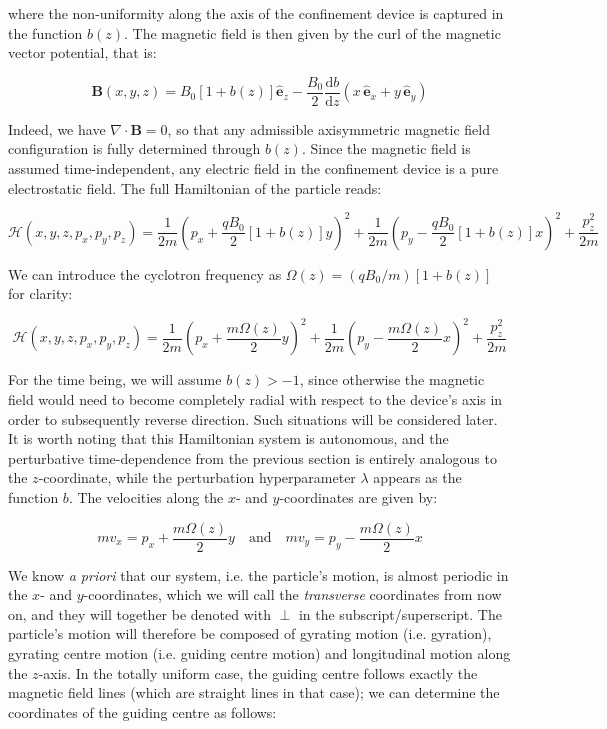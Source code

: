 where the non-uniformity along the axis of the confinement device is captured in the function $b(z)$. The magnetic field is then given by the curl of the magnetic vector potential, that is:

\begin{equation}
    \mathbf{B}(x,y,z)=B_0 \left[1+b(z)\right]\mathbf{\hat{e}}_z-\frac{B_0}{2}\frac{\mathrm{d}b}{\mathrm{d}z}\left(x\,\mathbf{\hat{e}}_x+y\,\mathbf{\hat{e}}_y\right)
\end{equation}

Indeed, we have $\nabla\cdot{\mathbf{B}}=0$, so that any admissible axisymmetric magnetic field configuration is fully determined through $b(z)$. Since the magnetic field is assumed time-independent, any electric field in the confinement device is a pure electrostatic field. The full Hamiltonian of the particle reads:

\begin{equation}
    \mathcal{H}(x,y,z,p_x,p_y,p_z)=\frac{1}{2m}\left(p_x+\frac{qB_0}{2}\left[1+b(z)\right]y\right)^2+\frac{1}{2m}\left(p_y-\frac{qB_0}{2}\left[1+b(z)\right]x\right)^2+\frac{p_z^2}{2m}
\end{equation}

We can introduce the cyclotron frequency as $\Omega(z)=\left(qB_0/m\right) \left[1+b(z)\right]$ for clarity:

\begin{equation}
    \mathcal{H}(x,y,z,p_x,p_y,p_z)=\frac{1}{2m}\left(p_x+\frac{m\Omega(z)}{2}y\right)^2+\frac{1}{2m}\left(p_y-\frac{m\Omega(z)}{2}x\right)^2+\frac{p_z^2}{2m}
\end{equation}

For the time being, we will assume $b(z)>-1$, since otherwise the magnetic field would need to become completely radial with respect to the device's axis in order to subsequently reverse direction. Such situations will be considered later. It is worth noting that this Hamiltonian system is autonomous, and the perturbative time-dependence from the previous section is entirely analogous to the $z$-coordinate, while the perturbation hyperparameter $\lambda$ appears as the function $b$. The velocities along the $x$- and $y$-coordinates are given by:

\begin{equation}
    mv_x=p_x+\frac{m\Omega(z)}{2}y\quad\text{and}\quad mv_y=p_y-\frac{m\Omega(z)}{2}x
\end{equation}

We know \textit{a priori} that our system, i.e. the particle's motion, is almost periodic in the $x$- and $y$-coordinates, which we will call the \textit{transverse} coordinates from now on, and they will together be denoted with $\perp$ in the subscript/superscript. The particle's motion will therefore be composed of gyrating motion (i.e. gyration), gyrating centre motion (i.e. guiding centre motion) and longitudinal motion along the $z$-axis. In the totally uniform case, the guiding centre follows exactly the magnetic field lines (which are straight lines in that case); we can determine the coordinates of the guiding centre as follows:

